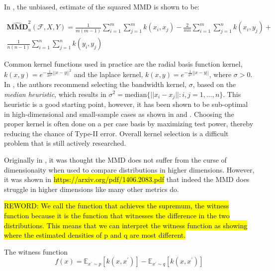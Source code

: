 In \cite{gretton2012kernel}, the unbiased, estimate of the squared MMD is shown to be:

\begin{equation}
\begin{split}
\widehat{\mathbf{M M D}}_{u}^{2}(\mathcal{F}, X, Y)=\frac{1}{m(m-1)} \sum_{i=1}^m \sum_{ j=1}^{m} k\left(x_{i}, x_{j}\right)-\frac{2}{m n} \sum_{i=1}^m \sum_{ j=1}^{n} k\left(x_{i}, y_{j}\right)+ \\
\frac{1}{n(n-1)} \sum_{i=1}^n \sum_{j=1}^{n} k\left(y_{i}, y_{j}\right)
\end{split}
\end{equation}



Common kernel functions used in practice are the radial basis function kernel, $k(x, y)= e^{-\frac{1}{2\sigma^2}||x-y||^2}$ and the laplace kernel, $k(x, y)= e^{-\frac{1}{\sigma^2}||x-y||}$, where $\sigma > 0$. In \cite{gretton2005kernel}, the authors recommend selecting the bandwidth kernel, $\sigma$, based on the \textit{median heuristic}, which results in $\sigma^2=\text{median}\{||x_i-x_j||:i,j = 1,...,n\}$. This heuristic is a good starting point, however, it has been shown to be sub-optimal in high-dimensional and small-sample cases as shown in \cite{muandet2014kernel} and \cite{ramdas2015decreasing}. Choosing the proper kernel is often done on a per case basis by maximizing test power, thereby reducing the chance of Type-II error. Overall kernel selection is a difficult problem that is still actively researched.

Originally in \cite{gretton2012kernel}, it was thought the MMD does not suffer from the curse of dimensionaity when used to compare distributions in higher dimensions. However, it was shown in \hl{https://arxiv.org/pdf/1406.2083.pdf} that indeed the MMD does struggle in higher dimensions like many other metrics do.

\hl{REWORD: We call the function that achieves the supremum, the witness function because it is the function that witnesses the difference in the two distributions. This means that we can interpret the witness function as showing where the estimated densities of
p and q are most different.}

The witness function 
\begin{equation}
f(x)=\mathbb{E}_{x^{\prime} \sim p}\left[k\left(x, x^{\prime}\right)\right]-\mathbb{E}_{x^{\prime} \sim q}\left[k\left(x, x^{\prime}\right)\right]
\end{equation}

